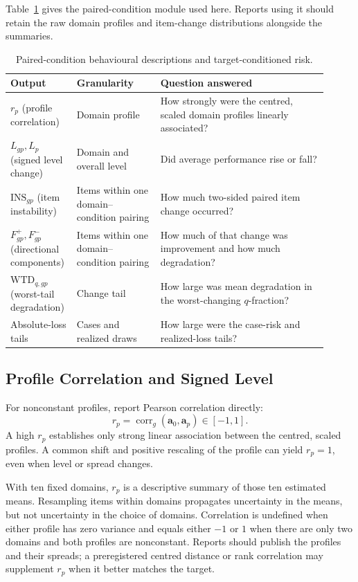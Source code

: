 \documentclass[12pt]{article}
\newcommand{\ins}{\mathrm{INS}}
\newcommand{\wtd}{\mathrm{WTD}}
\begin{document}
Table~\ref{tab:descriptions} gives the paired-condition module used here. Reports using it should retain the raw domain profiles and item-change distributions alongside the summaries.

\begin{table}[tbp]
\centering\small
\caption{Paired-condition behavioural descriptions and target-conditioned risk.}\label{tab:descriptions}
\begin{tabular}{@{}>{\raggedright\arraybackslash}p{0.16\linewidth}
                    >{\raggedright\arraybackslash}p{0.25\linewidth}
                    >{\raggedright\arraybackslash}p{0.50\linewidth}@{}}
\toprule
Output & Granularity & Question answered \\
\midrule
\(r_p\) (profile correlation) & Domain profile & How strongly were the centred, scaled domain profiles linearly associated? \\
\(L_{gp},L_p\) (signed level change) & Domain and overall level & Did average performance rise or fall? \\
\(\ins_{gp}\) (item instability) & Items within one domain--condition pairing & How much two-sided paired item change occurred? \\
\(F^+_{gp},F^-_{gp}\) (directional components) & Items within one domain--condition pairing & How much of that change was improvement and how much degradation? \\
\(\wtd_{q,gp}\) (worst-tail degradation) & Change tail & How large was mean degradation in the worst-changing \(q\)-fraction? \\
Absolute-loss tails & Cases and realized draws & How large were the case-risk and realized-loss tails? \\
\bottomrule
\end{tabular}
\end{table}

\subsection{Profile Correlation and Signed Level}\label{ssec:profile_level}

For nonconstant profiles, report Pearson correlation directly:
\[
r_p=\operatorname{corr}_g(\mathbf a_0,\mathbf a_p)\in[-1,1].
\]
A high \(r_p\) establishes only strong linear association between the centred, scaled profiles. A common shift and positive rescaling of the profile can yield \(r_p=1\), even when level or spread changes.

With ten fixed domains, \(r_p\) is a descriptive summary of those ten estimated means. Resampling items within domains propagates uncertainty in the means, but not uncertainty in the choice of domains. Correlation is undefined when either profile has zero variance and equals either \(-1\) or \(1\) when there are only two domains and both profiles are nonconstant. Reports should publish the profiles and their spreads; a preregistered centred distance or rank correlation may supplement \(r_p\) when it better matches the target.
\end{document}
